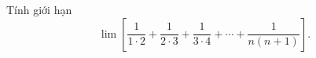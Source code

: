 \begin{ex}
Tính giới hạn \[\lim\left[\dfrac1{1\cdot2}+\dfrac1{2\cdot3}+\dfrac1{3\cdot4}+\cdots+\dfrac1{n(n+1)}\right].\]
\end{ex}
